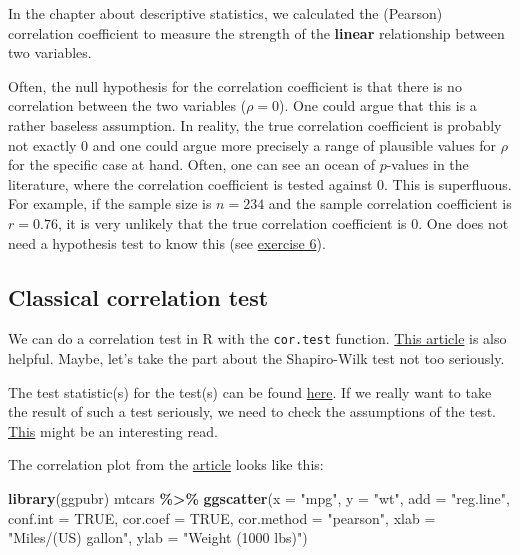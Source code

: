 \documentclass[
]{book}
\newenvironment{Shaded}{\begin{snugshade}}{\end{snugshade}}
\newcommand{\AttributeTok}[1]{\textcolor[rgb]{0.13,0.29,0.53}{#1}}
\newcommand{\ConstantTok}[1]{\textcolor[rgb]{0.56,0.35,0.01}{#1}}
\newcommand{\FunctionTok}[1]{\textcolor[rgb]{0.13,0.29,0.53}{\textbf{#1}}}
\newcommand{\NormalTok}[1]{#1}
\newcommand{\SpecialCharTok}[1]{\textcolor[rgb]{0.81,0.36,0.00}{\textbf{#1}}}
\newcommand{\StringTok}[1]{\textcolor[rgb]{0.31,0.60,0.02}{#1}}
\begin{document}
In the chapter about descriptive statistics, we calculated the (Pearson) correlation coefficient
to measure the strength of the \textbf{linear} relationship between two variables.

Often, the null hypothesis for the correlation coefficient is that there is no correlation between
the two variables (\(\rho=0\)). One could argue that this is a rather baseless assumption. In reality,
the true correlation coefficient is probably not exactly 0 and one could argue more precisely a range
of plausible values for \(\rho\) for the specific case at hand. Often, one can see an ocean of \(p\)-values
in the literature, where the correlation coefficient is tested against 0. This is superfluous.
For example, if the sample size is \(n=234\) and the sample correlation coefficient is \(r = 0.76\), it
is very unlikely that the true correlation coefficient is 0. One does not need a hypothesis test to
know this (see \hyperref[exercise6_nhst]{exercise 6}).

\subsection{Classical correlation test}\label{classical-correlation-test}

We can do a correlation test in R with the \texttt{cor.test} function.
\href{https://www.sthda.com/english/wiki/correlation-test-between-two-variables-in-r}{This article} is also helpful.
Maybe, let's take the part about the Shapiro-Wilk test not too seriously.

The test statistic(s) for the test(s) can be found \href{https://en.wikipedia.org/wiki/Pearson_correlation_coefficient\#Inference}{here}.
If we really want to take the result of such a test seriously, we need to check the assumptions of the test.
\href{https://core.ac.uk/download/pdf/234680353.pdf}{This} might be an interesting read.

The correlation plot from the \href{https://www.sthda.com/english/wiki/correlation-test-between-two-variables-in-r}{article} looks like this:

\begin{Shaded}
\begin{Highlighting}[]
\FunctionTok{library}\NormalTok{(ggpubr)}
\NormalTok{mtcars }\SpecialCharTok{\%\textgreater{}\%}
  \FunctionTok{ggscatter}\NormalTok{(}\AttributeTok{x =} \StringTok{"mpg"}\NormalTok{, }\AttributeTok{y =} \StringTok{"wt"}\NormalTok{,}
            \AttributeTok{add =} \StringTok{"reg.line"}\NormalTok{, }\AttributeTok{conf.int =} \ConstantTok{TRUE}\NormalTok{,}
            \AttributeTok{cor.coef =} \ConstantTok{TRUE}\NormalTok{, }\AttributeTok{cor.method =} \StringTok{"pearson"}\NormalTok{,}
            \AttributeTok{xlab =} \StringTok{"Miles/(US) gallon"}\NormalTok{, }\AttributeTok{ylab =} \StringTok{"Weight (1000 lbs)"}\NormalTok{)}
\end{Highlighting}
\end{Shaded}
\end{document}
